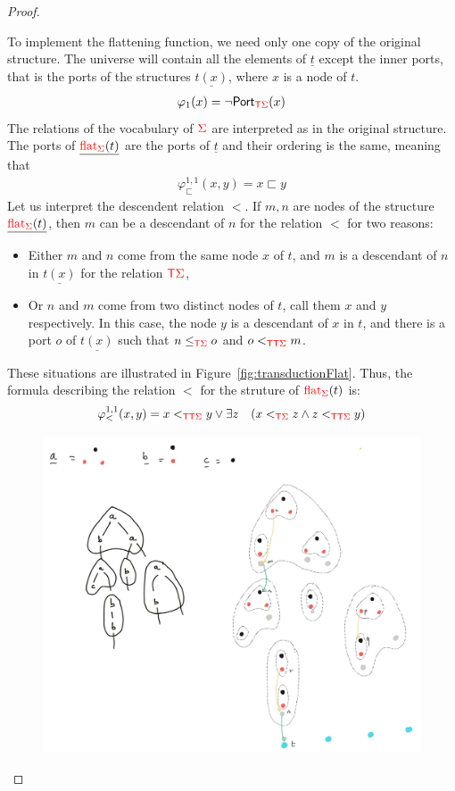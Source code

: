 \begin{proof}
\begin{enumerate}
 To implement the flattening function, we need only one copy of the original structure. The universe will contain all the elements of $\underline{t}$ except the inner ports, that is the ports of the structures $\underline{t(x)}$, where $x$ is a node of $t$.    
 \begin{align*}
 \varphi_1(x)=\neg \mathsf{Port}_{{\color{red}{\mathsf T}} {\color{red}{\Sigma}}}(x)
 \end{align*}
The relations of the vocabulary of ${\color{red}{\Sigma}}$ are interpreted as in the original structure. The ports of $\underline{{\color{red}{\mathrm{flat}}}_{\color{red}{\Sigma}}(t)}$ are the ports of $\underline{t}$ and their ordering is the same, meaning that
\begin{align*}
\varphi^{1,1}_{\sqsubset}(x,y)= x\sqsubset y
\end{align*}
Let us interpret the descendent relation $<$.  If $m, n$ are nodes of the structure $\underline{{\color{red}{\mathrm{flat}}}_{\color{red}{\Sigma}}(t)}$, then $m$ can be a descendant of $n$ for the relation $<$ for two reasons:
\begin{itemize}
\item Either $m$ and $n$ come from the same node $x$ of $t$, and $m$ is a descendant of $n$ in $\underline{t(x)}$ for the relation ${\color{red}{\mathsf T}} {\color{red}{\Sigma}}$,
\item Or $n$ and $m$ come from two distinct nodes of $t$, call them $x$ and $y$ respectively. In this case, the node $y$ is a descendant of $x$ in $t$, and there is a port $o$ of $\underline{t(x)}$ such that $n\leq_{{\color{red}{\mathsf T}} {\color{red}{\Sigma}}} o$ and $o<_{{\color{red}{\mathsf T}}{\color{red}{\mathsf T}} {\color{red}{\Sigma}}} m$.  
 \end{itemize}
These situations are illustrated in Figure~\ref{fig:transductionFlat}. Thus, the formula describing the relation $<$ for the struture of ${\color{red}{\mathrm{flat}}}_{\color{red}{\Sigma}}(t)$ is:
\begin{align*}
\varphi^{1,1}_<(x,y)= x<_{\tmonad\tmonad \rSigma}y \vee \exists z\ \ \ (x<_{\tmonad \rSigma}z \wedge z<_{\tmonad\tmonad \rSigma} y) 
\end{align*}
    \begin{figure}
    \includegraphics[scale=.1]{MyPic9.jpg}

\end{figure}
\end{enumerate}
\end{proof}
